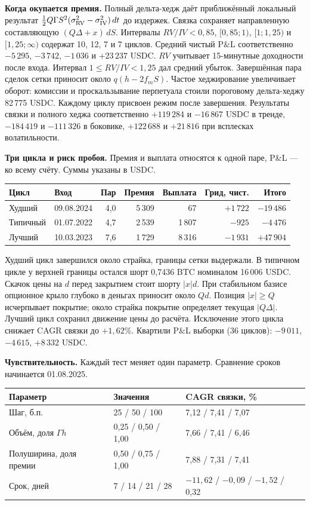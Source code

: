 \documentclass[12pt,a4paper]{article}
\newcommand{\sub}[1]{\par\textbf{#1.}\enspace\ignorespaces}
\begin{document}
\sub{Когда окупается премия} Полный дельта-хедж даёт приближённый локальный результат $\tfrac12 Q\Gamma S^2(\sigma_{\rm RV}^2-\sigma_{\rm IV}^2)\,dt$ до издержек. Связка сохраняет направленную составляющую $(Q\Delta+x)\,dS$. Интервалы $RV/IV<0{,}85$, $[0{,}85;1)$, $[1;1{,}25)$ и $[1{,}25;\infty)$ содержат 10, 12, 7 и 7 циклов. Средний чистый P\&L соответственно $-5\,295$, $-3\,742$, $-1\,036$ и $+23\,237$ USDC. $RV$ учитывает 15-минутные доходности после входа. Интервал $1\le RV/IV<1{,}25$ дал средний убыток. Завершённая пара сделок сетки приносит около $q(h-2f_m S)$. Частое хеджирование увеличивает оборот: комиссии и проскальзывание перпетуала стоили пороговому дельта-хеджу 82\,775 USDC.
Каждому циклу присвоен режим после завершения. Результаты связки и полного хеджа соответственно $+119\,284$ и $-16\,867$ USDC в тренде, $-184\,419$ и $-111\,326$ в боковике, $+122\,688$ и $+21\,816$ при всплесках волатильности.
\sub{Три цикла и риск пробоя} Премия и выплата относятся к одной паре, P\&L --- ко всему счёту. Суммы указаны в USDC.
\begin{center}\normalsize\begin{tabular}{@{}llrrrrr@{}}\toprule
Цикл & Вход & Пар & Премия & Выплата & Грид, чист. & Итого\\\midrule
Худший & 09.08.2024 & 4,0 & 5\,309 & 67 & $+1\,722$ & $-19\,486$\\
Типичный & 01.07.2022 & 4,7 & 2\,539 & 1\,807 & $-925$ & $-4\,476$\\
Лучший & 10.03.2023 & 7,6 & 1\,729 & 8\,316 & $-1\,931$ & $+47\,904$\\\bottomrule
\end{tabular}\end{center}
Худший цикл завершился около страйка, границы сетки выдержали. В типичном цикле у верхней границы остался шорт 0,7436 BTC номиналом 16\,006 USDC. Скачок цены на $d$ перед закрытием стоит шорту $|x|d$. При стабильном базисе опционное крыло глубоко в деньгах приносит около $Qd$. Позиция $|x|\ge Q$ исчерпывает покрытие; около страйка покрытие определяет текущая $|Q\Delta|$. Лучший цикл сохранил движение цены до расчёта. Исключение этого цикла снижает CAGR связки до $+1{,}62\%$. Квартили P\&L выборки (36 циклов): $-9\,011$, $-4\,615$, $+8\,332$ USDC.
\sub{Чувствительность} Каждый тест меняет один параметр. Сравнение сроков начинается 01.08.2025.
\begin{center}\normalsize\begin{tabular}{@{}lll@{}}\toprule
Параметр & Значения & CAGR связки, \%\\\midrule
Шаг, б.п. & 25 / 50 / 100 & 7,12 / 7,41 / 7,07\\
Объём, доля $\Gamma h$ & 0,25 / 0,50 / 1,00 & 7,66 / 7,41 / 6,46\\
Полуширина, доля премии & 0,50 / 0,75 / 1,00 & 7,88 / 7,31 / 7,41\\
Срок, дней & 7 / 14 / 21 / 28 & $-11{,}62$ / $-0{,}09$ / $-1{,}52$ / 0,32\\\bottomrule
\end{tabular}\end{center}
\end{document}
